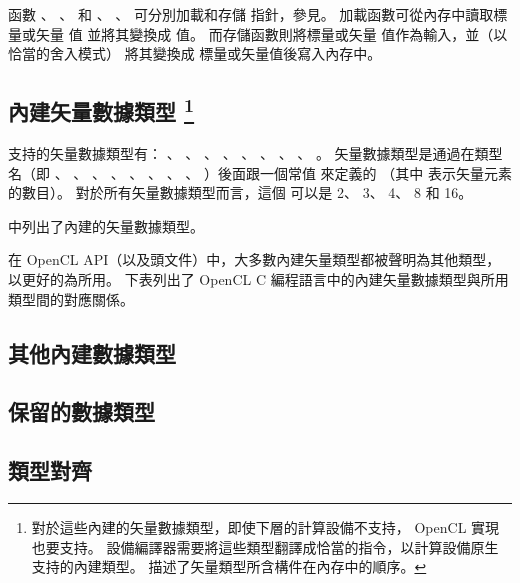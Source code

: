 函數 、 、 
 和 、 、 
 可分別加載和存儲  指針，參見。
加載函數可從內存中讀取標量或矢量  值 並將其變換成  值。
而存儲函數則將標量或矢量  值作為輸入，並（以恰當的舍入模式）
將其變換成  標量或矢量值後寫入內存中。


\subsection{內建矢量數據類型
\footnote{對於這些內建的矢量數據類型，即使下層的計算設備不支持， OpenCL 實現也要支持。
設備編譯器需要將這些類型翻譯成恰當的指令，以計算設備原生支持的內建類型。
 描述了矢量類型所含構件在內存中的順序。}}

支持的矢量數據類型有： 、 、 、
 、 、 、
 、 、 。
矢量數據類型是通過在類型名（即 、 、 、
 、 、 、 、 、
 ）後面跟一個常值  來定義的
（其中  表示矢量元素的數目）。
對於所有矢量數據類型而言，這個  可以是 2、 3、 4、 8 和 16。

中列出了內建的矢量數據類型。

{}

在 OpenCL API（以及頭文件）中，大多數內建矢量類型都被聲明為其他類型，
以更好的為所用。
下表列出了 OpenCL C 編程語言中的內建矢量數據類型與所用類型間的對應關係。



\subsection{其他內建數據類型}

\subsection{保留的數據類型}

\subsection{類型對齊}

